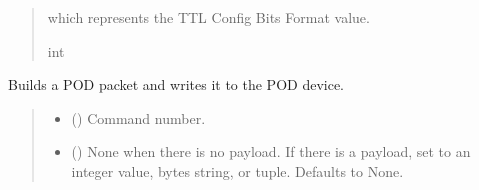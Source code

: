 \documentclass[letterpaper,10pt,english]{sphinxmanual}
\begin{document}
\begin{fulllineitems}
\begin{fulllineitems}
\begin{quote}
\begin{description}
\begin{itemize}
\end{itemize}

\sphinxAtStartPar
which represents the TTL Config Bits Format value.

\sphinxAtStartPar
int

\end{description}\end{quote}

\end{fulllineitems}


\begin{fulllineitems}
\label{\detokenize{Morelia.Devices:Morelia.Devices.PodDevice_8480SC.Pod8480SC.WritePacket}}
\pysigstartsignatures
{}
\pysigstopsignatures
\sphinxAtStartPar
Builds a POD packet and writes it to the POD device.
\begin{quote}\begin{description}
\begin{itemize}
\item {} 
\sphinxAtStartPar
{} (\sphinxstyleliteralemphasis{\sphinxupquote{ | }}) \textendash{} Command number.

\item {} 
\sphinxAtStartPar
{} (\sphinxstyleliteralemphasis{\sphinxupquote{ | }}\sphinxstyleliteralemphasis{\sphinxupquote{ | }}\sphinxstyleliteralemphasis{\sphinxupquote{{[}}}\sphinxstyleliteralemphasis{\sphinxupquote{ | }}\sphinxstyleliteralemphasis{\sphinxupquote{{]}}}\sphinxstyleliteralemphasis{\sphinxupquote{, }}) \textendash{} None when there is no payload. If there                 is a payload, set to an integer value, bytes string, or tuple. Defaults to None.


\end{itemize}
\end{description}
\end{quote}
\end{fulllineitems}
\end{fulllineitems}
\end{document}
